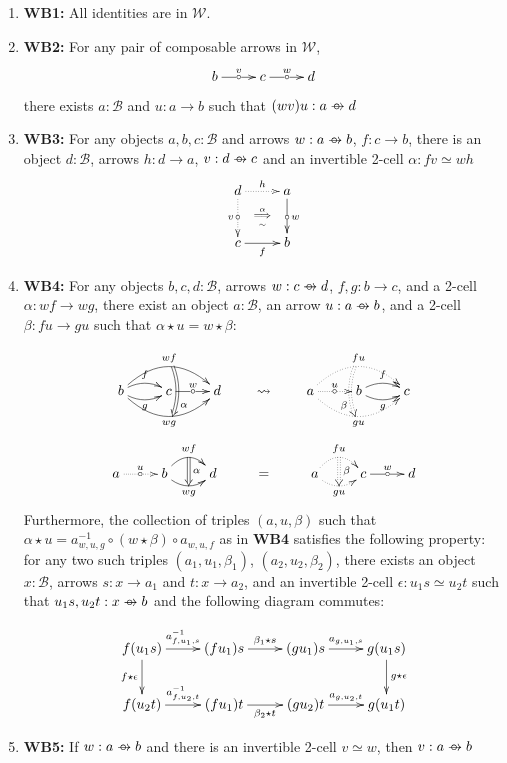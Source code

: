 \documentclass{article}
\numberwithin{equation}{section}
\theoremstyle{definition}
\theoremstyle{plain}
\newcommand{\wto}{\to \hspace{-1.1em} \circ \hspace{0.6em}}
\begin{document}

\begin{enumerate}[label = $\bullet$]
	\item \textbf{WB1:} All identities are in $\mathcal{W}$.
	
	\item \textbf{WB2:}  For any pair of composable arrows in $\mathcal{W}$, 
	\[\xymatrix{b \ar[r]^v|{\circ} & c \ar[r]^w|{\circ} & d}\] there exists $a:\mathcal{B}$ and $u:a \to b$ such that $(wv)u: a \wto d$
	
	\item \textbf{WB3:} For any objects $a,b,c:\mathcal{B}$ and arrows $w: a \wto b$, $f: c \to b$, there is an object $d:\mathcal{B}$, arrows $h: d \to a$, $v: d \wto c$ and an invertible 2-cell $\alpha: fv \simeq wh$ \[\xymatrix{d \ar@{.>}[r]^h \ar@{.>}[d]_v|{\circ} \ar@{}[dr]|{\overset{\alpha}{\underset{\sim}{\Longrightarrow}}}& a\ar[d]^w|{\circ}\\c \ar[r]_f & b}\]
	
	\item \textbf{WB4:} For any objects $b,c,d:\mathcal{B}$, arrows $w: c \wto d$, $f,g: b \to c$, and a 2-cell $\alpha: wf \to wg$,  there exist an object $a:\mathcal{B}$, an arrow $u: a \wto b$, and a 2-cell $\beta: fu \to gu$   such that $\alpha \star u = w \star \beta$:
	
	\[\xymatrix{
		b \ar@/^/[r]^f \ar@/_/[r]_g \ar@/^1.5pc/[rr]^{wf}="1" \ar@/_1.5pc/[rr]_{wg}="2" & c \ar[r]^w|{\circ} & d \ar@/^/@{=>}^(0.7){\alpha}"1";"2"
	}
	\qquad \leadsto \qquad
	\xymatrix{
		a\ar@{.>}[r]^u|{\circ} \ar@{.>}@/^1.5pc/[rr]^{fu}="1" \ar@{.>}@/_1.5pc/[rr]_{gu}="2" & b \ar@/^/[r]^f \ar@/_/[r]_g & c \ar@/_/@{:>}_(0.7){\beta}"1";"2"
	}
	\]
	\[
	\xymatrix{
		a \ar@{.>}[r]^u|{\circ}  & b \ar@/^1pc/[r]^{wf}="1" \ar@/_0.7pc/[r]_{wg}="2" & d & = & a \ar@{.>}@/^1pc/[r]^{fu}="3" \ar@{.>}@/_0.7pc/[r]_{gu}="4" & c \ar[r]^w|{\circ} & d \ar@{=>}^{\alpha}"1";"2"\ar@{:>}^{\beta}"3";"4"
	}
	\]
	Furthermore, the collection of triples $(a, u, \beta)$ such that $\alpha \star u = a_{w,u,g}^{-1} \circ (w \star \beta) \circ a_{w,u,f}$ as in {\bf WB4} satisfies the following property: for any two such triples $(a_1, u_1, \beta_1)$, $(a_2, u_2, \beta_2)$, there exists an object $x:\mathcal{B}$, arrows $s: x \to a_1$ and $t:x \to a_2$, and an invertible 2-cell $\epsilon: u_1 s \simeq u_2 t$ such that $u_1 s,u_2 t: x \wto b$ and the following diagram commutes: 
	
	\[\xymatrix{f(u_1s) \ar[d]_{f \star \epsilon} \ar[r]^{a^{-1}_{f,u_1,s}} & (fu_1)s \ar[r]^{\beta_1 \star s} & (gu_1)s \ar[r]^{a_{g,u_1,s}} & g(u_1s)\ar[d]^{g \star \epsilon}\\f(u_2t)\ar[r]^{a^{-1}_{f,u_2,t}} & (fu_1)t  \ar[r]_{\beta_2 \star t} & (gu_2)t\ar[r]^{a_{g,u_2,t}} & g(u_1t)}\]
	
	
	\item \textbf{WB5:} If $w:a \wto b$ and there is an invertible 2-cell $v \simeq w$, then $v:a \wto b$
\end{enumerate}
\end{document}
